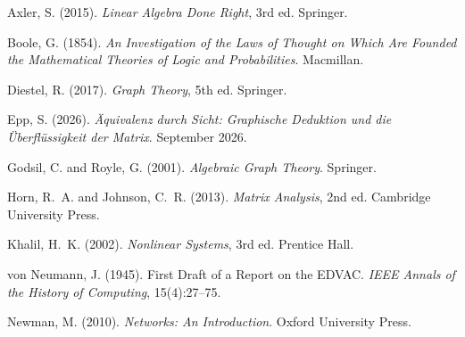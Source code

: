 \documentclass[12pt, a4paper]{article}
\theoremstyle{definition}
\theoremstyle{remark}
\begin{document}

\nocite{bennett1973,coverthomas2006,hartley1928,hopcroft2006,karp1972,
  katzborriello2005,landauer1961,mackay2003,mano2007,mccluskey1965,
  neamen2012,nyquist1928,pattersonhennessy2017,pierret1996,sedrasmith2020,
  sipser2012,sze1998,tanenbaum2013,meadconway1980,westeharris2011,
  ashcroftmermin1976,bartee1985,hopcroftullman1979,kasper1980,
  kittel2005,kleinberg2006,knuth1997,leevaraiya2000,moore1965,
  shankar1994,stallings2016,bardeenbrattain1948,feynman1963,hamming1950,
  haykin2009,knuth1998,kuroseross2017,lathiding2018,nielsenchuang2010,
  nilssonriedel2014,papadimitriou1994,press2007,russellnorvig2021,
  shannon1948,strang2016,taubschilling1986,tannenbaumwetherall2011,
  vetterlikovacevic2014}
\begin{thebibliography}{99}

Axler, S. (2015).
\newblock \textit{Linear Algebra Done Right}, 3rd ed.
\newblock Springer.

Boole, G. (1854).
\newblock \textit{An Investigation of the Laws of Thought on Which Are Founded the Mathematical Theories of Logic and Probabilities}.
\newblock Macmillan.

Diestel, R. (2017).
\newblock \textit{Graph Theory}, 5th ed.
\newblock Springer.

Epp, S. (2026).
\newblock \textit{Äquivalenz durch Sicht: Graphische Deduktion und die Überflüssigkeit der Matrix}.
\newblock September 2026.

Godsil, C. and Royle, G. (2001).
\newblock \textit{Algebraic Graph Theory}.
\newblock Springer.

Horn, R.~A. and Johnson, C.~R. (2013).
\newblock \textit{Matrix Analysis}, 2nd ed.
\newblock Cambridge University Press.

Khalil, H.~K. (2002).
\newblock \textit{Nonlinear Systems}, 3rd ed.
\newblock Prentice Hall.

von Neumann, J. (1945).
\newblock First Draft of a Report on the EDVAC.
\newblock \textit{IEEE Annals of the History of Computing}, 15(4):27--75.

Newman, M. (2010).
\newblock \textit{Networks: An Introduction}.
\newblock Oxford University Press.


\end{thebibliography}
\end{document}
